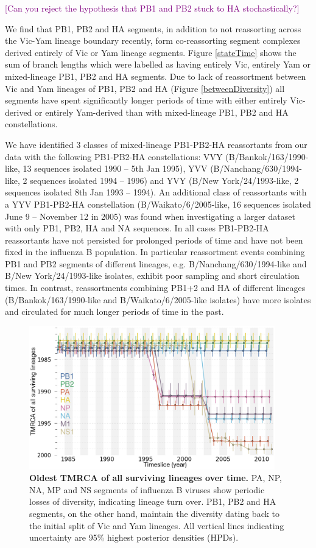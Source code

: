 \documentclass[11pt,oneside,letterpaper]{article}
\def\tbc#1{\textcolor{purple}{[#1]}}
\begin{document}
\tbc{Can you reject the hypothesis that PB1 and PB2 stuck to HA stochastically?}

We find that PB1, PB2 and HA segments, in addition to not reassorting across the Vic-Yam lineage boundary recently, form co-reassorting segment complexes derived entirely of Vic or Yam lineage segments.
Figure \ref{stateTime} shows the sum of branch lengths which were labelled as having entirely Vic, entirely Yam or mixed-lineage PB1, PB2 and HA segments.
Due to lack of reassortment between Vic and Yam lineages of PB1, PB2 and HA (Figure \ref{betweenDiversity}) all segments have spent significantly longer periods of time with either entirely Vic-derived or entirely Yam-derived than with mixed-lineage PB1, PB2 and HA constellations.


We have identified 3 classes of mixed-lineage PB1-PB2-HA reassortants from our data with the following PB1-PB2-HA constellations: VVY (B/Bankok/163/1990-like, 13 sequences isolated 1990 -- 5th Jan 1995), YVV (B/Nanchang/630/1994-like, 2 sequences isolated 1994 -- 1996) and YVY (B/New York/24/1993-like, 2 sequences isolated 8th Jan 1993 -- 1994).
An additional class of reassortants with a YYV PB1-PB2-HA constellation (B/Waikato/6/2005-like, 16 sequences isolated June 9 -- November 12 in 2005) was found when investigating a larger dataset with only PB1, PB2, HA and NA sequences.
In all cases PB1-PB2-HA reassortants have not persisted for prolonged periods of time and have not been fixed in the influenza B population.
In particular reassortment events combining PB1 and PB2 segments of different lineages, e.g. B/Nanchang/630/1994-like and B/New York/24/1993-like isolates, exhibit poor sampling and short circulation times.
In contrast, reassortments combining PB1+2 and HA of different lineages (B/Bankok/163/1990-like and B/Waikato/6/2005-like isolates) have more isolates and circulated for much longer periods of time in the past.

\begin{figure}[h]
	\centering		
	\includegraphics[width=0.95\textwidth]{figures/InfB_tmrcaOT_lines.png}
	\caption{\textbf{Oldest TMRCA of all surviving lineages over time.}
PA, NP, NA, MP and NS segments of influenza B viruses show periodic losses of diversity, indicating lineage turn over.
PB1, PB2 and HA segments, on the other hand, maintain the diversity dating back to the initial split of Vic and Yam lineages.
All vertical lines indicating uncertainty are 95\% highest posterior densities (HPDs).}
	\label{tmrcaOT}
\end{figure}
\end{document}
